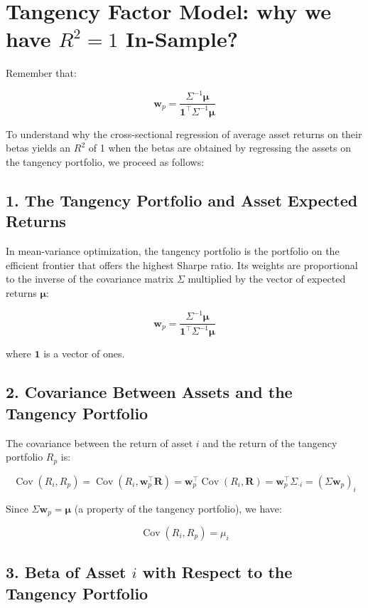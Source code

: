 \documentclass{article}
\begin{document}
\section*{Tangency Factor Model: why we have \( R^2 = 1 \) In-Sample?}

Remember that:

\[
\mathbf{w}_p = \frac{\Sigma^{-1} \boldsymbol{\mu}}{\mathbf{1}^\top \Sigma^{-1} \boldsymbol{\mu}}
\]



To understand why the cross-sectional regression of average asset returns on their betas yields an \( R^2 \) of 1 when the betas are obtained by regressing the assets on the tangency portfolio, we proceed as follows:

\subsection*{1. The Tangency Portfolio and Asset Expected Returns}

In mean-variance optimization, the tangency portfolio is the portfolio on the efficient frontier that offers the highest Sharpe ratio. Its weights are proportional to the inverse of the covariance matrix \( \Sigma \) multiplied by the vector of expected returns \( \boldsymbol{\mu} \):

\[
\mathbf{w}_p = \frac{\Sigma^{-1} \boldsymbol{\mu}}{\mathbf{1}^\top \Sigma^{-1} \boldsymbol{\mu}}
\]

where \( \mathbf{1} \) is a vector of ones.

\subsection*{2. Covariance Between Assets and the Tangency Portfolio}

The covariance between the return of asset \( i \) and the return of the tangency portfolio \( R_p \) is:

\[
\operatorname{Cov}(R_i, R_p) = \operatorname{Cov}\left(R_i, \mathbf{w}_p^\top \mathbf{R}\right) = \mathbf{w}_p^\top \operatorname{Cov}(R_i, \mathbf{R}) = \mathbf{w}_p^\top \Sigma_{\cdot i} = (\Sigma \mathbf{w}_p)_i
\]

Since \( \Sigma \mathbf{w}_p = \boldsymbol{\mu} \) (a property of the tangency portfolio), we have:

\[
\operatorname{Cov}(R_i, R_p) = \mu_i
\]

\subsection*{3. Beta of Asset \( i \) with Respect to the Tangency Portfolio}
\end{document}
